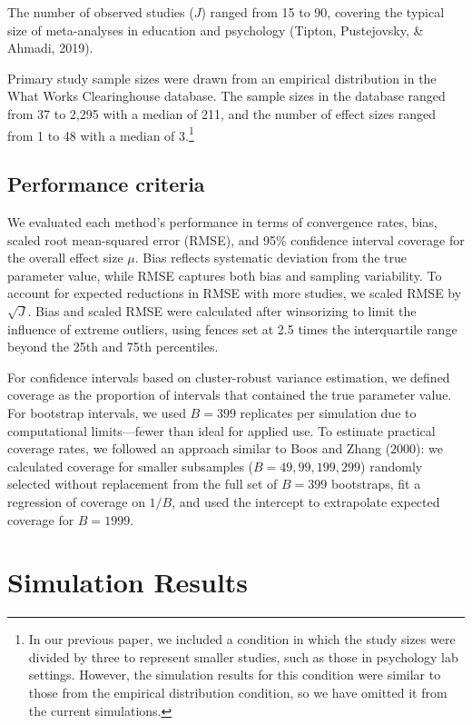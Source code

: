 \documentclass[
  american,
  man, donotrepeattitle,floatsintext]{apa7}
\begin{document}
The number of observed studies (\(J\)) ranged from 15 to 90, covering the typical size of meta-analyses in education and psychology (Tipton, Pustejovsky, \& Ahmadi, 2019).

Primary study sample sizes were drawn from an empirical distribution in the What Works Clearinghouse database. The sample sizes in the database ranged from 37 to 2,295 with a median of 211, and the number of effect sizes ranged from 1 to 48 with a median of 3.\footnote{
  In our previous paper, we included a condition in which the study sizes were divided by three to represent smaller studies, such as those in psychology lab settings. However, the simulation results for this condition were similar to those from the empirical distribution condition, so we have omitted it from the current simulations.}

\subsection{Performance criteria}\label{performance-criteria}

We evaluated each method's performance in terms of convergence rates, bias, scaled root mean-squared error (RMSE), and 95\% confidence interval coverage for the overall effect size \(\mu\). Bias reflects systematic deviation from the true parameter value, while RMSE captures both bias and sampling variability. To account for expected reductions in RMSE with more studies, we scaled RMSE by \(\sqrt{J}\). Bias and scaled RMSE were calculated after winsorizing to limit the influence of extreme outliers, using fences set at 2.5 times the interquartile range beyond the 25th and 75th percentiles.

For confidence intervals based on cluster-robust variance estimation, we defined coverage as the proportion of intervals that contained the true parameter value. For bootstrap intervals, we used \(B = 399\) replicates per simulation due to computational limits---fewer than ideal for applied use. To estimate practical coverage rates, we followed an approach similar to Boos and Zhang (2000): we calculated coverage for smaller subsamples (\(B = 49, 99, 199, 299\)) randomly selected without replacement from the full set of \(B = 399\) bootstraps, fit a regression of coverage on \(1/B\), and used the intercept to extrapolate expected coverage for \(B = 1999\).

\section{Simulation Results}\label{simulation-results}
\end{document}
